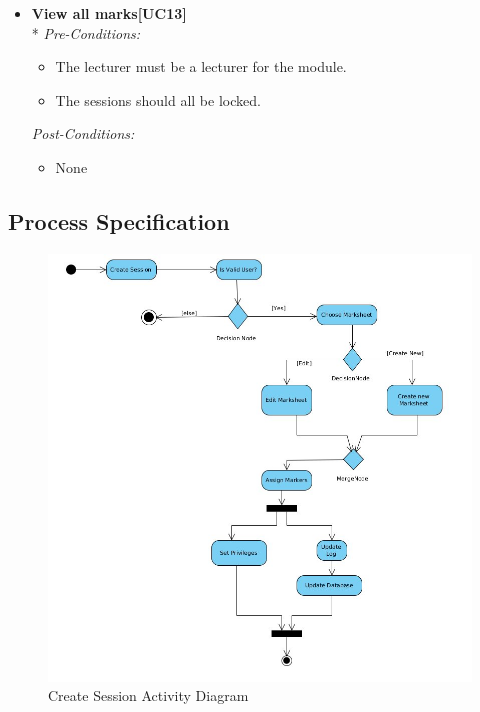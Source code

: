 \documentclass[a4paper]{article}
\begin{document}
\begin{itemize}
				\item	\textbf{View all marks[UC13]}\\*
						\textit{Pre-Conditions:}
								\begin{itemize}
									\item The lecturer must be a lecturer for the module.
									\item The sessions should all be locked.
								\end{itemize}
								
						\textit{Post-Conditions:}
								\begin{itemize}
									\item None
								\end{itemize}
			\end{itemize}

		\subsection{Process Specification}
		
		
			\begin{figure}[H]
				\centering
				\includegraphics[width=1\textwidth]{CreateSessionActivityDiagram}
				\caption{Create Session Activity Diagram}
			\end{figure}
			
\end{document}
